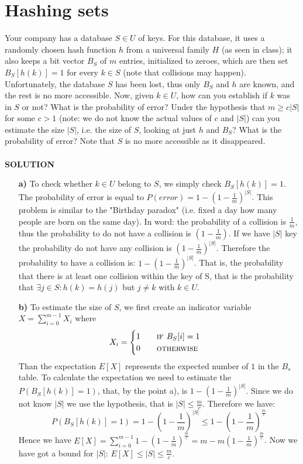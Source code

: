 \documentclass[a4paper]{article}
\begin{document}
\section*{Hashing sets}
Your company has a database $S \in U$ of keys. For this database, it uses a randomly chosen hash function $h$ from a universal family $H$ (as seen in class); it also keeps a bit vector $B_S$ of $m$ entries, initialized to zeroes, which are then set $B_S[h(k)] = 1$ for every $k \in S$ (note that collisions may happen). Unfortunately, the database $S$ has been lost, thus only $B_S$ and $h$ are known, and the rest is no more accessible. Now, given $k \in U$, how can you establish if $k$ was in $S$ or not? What is the probability of error? Under the hypothesis that $m \geq c|S|$ for some $c > 1$ (note: we do not know the actual values of $c$ and $|S|$) can you estimate the size $|S|$, i.e. the size of $S$, looking at just $h$ and $B_S$? What is the probability of error? Note that $S$ is no more accessible as it disappeared.\\ 
\\
\textbf{SOLUTION}
\\

\begin{itemize}
\item[\textbf{a)}] To check whether $k\in U$ belong to $S$, we simply check $B_S[h(k)]=1$. The probability of error is equal to $P(error)=1-(1 - \frac{1}{m})^{|S|}$. This problem is similar to the "Birthday paradox" (i.e. fixed a day how many people are born on the same day). In word: the probability of a collision is $\frac{1}{m}$, thus the probability to do not have a collision is $(1-\frac{1}{m})$. If we have $|S|$ key the probability do not have any collision is $(1 - \frac{1}{m})^{|S|}$. Therefore the probability to have a collision is: $1-(1 - \frac{1}{m})^{|S|}$. That is, the probability that there is at least one collision within the key of S, that is the probability that $\exists j\in S : h(k)=h(j)$ but $j\neq k$ with $k \in U$.
\item[\textbf{b)}] To estimate the size of $S$, we first create an indicator variable $X=\sum_{i=0}^{m-1}X_i$ where
\begin{equation}
X_{i} =  
\begin{cases} 
1 \qquad \textsc{if }B_S[i]=1\\
0 \qquad \textsc{otherwise}
\end{cases}
\nonumber
\end{equation}
Than the expectation $E[X]$ represents the expected number of $1$ in the $B_s$ table. To calculate the expectation we need to estimate the $P(B_S[h(k)]=1)$, that, by the point a), is $1-(1 - \frac{1}{m})^{|S|}$. Since we do not know $|S|$ we use the hypothesis, that is $|S|\leq \frac{m}{c}$. Therefore we have:
\begin{equation}
P(B_S[h(k)]=1)=1-(1 - \frac{1}{m})^{|S|} \leq 1-(1 - \frac{1}{m})^{\frac{m}{c}}
\nonumber
\end{equation}
Hence we have $E[X]= \sum_{i=0}^{m-1} 1-(1 - \frac{1}{m})^{\frac{m}{c}}=m-m(1 - \frac{1}{m})^{\frac{m}{c}}$. Now we have got a bound for $|S|$: $E[X]\leq|S|\leq \frac{m}{c}$.
\end{itemize}
\end{document}

